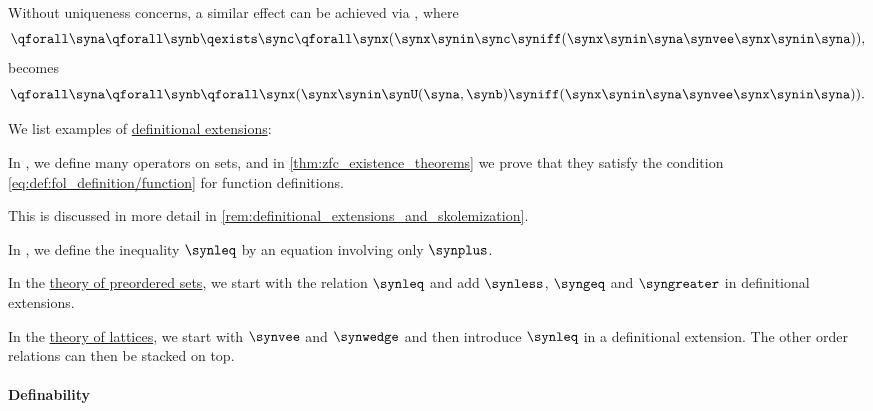 \begin{remark}
  Without uniqueness concerns, a similar effect can be achieved via , where
  \begin{equation*}
    \qforall \syna \qforall \synb \qexists \sync \qforall \synx (\synx \synin \sync \syniff (\synx \synin \syna \synvee \synx \synin \syna)),
  \end{equation*}
  becomes
  \begin{equation*}
    \qforall \syna \qforall \synb \qforall \synx (\synx \synin \synU(\syna, \synb) \syniff (\synx \synin \syna \synvee \synx \synin \syna)).
  \end{equation*}
\end{remark}

\begin{example}\label{ex:def:fol_definitional_extension}
  We list examples of \hyperref[def:fol_definitional_extension]{definitional extensions}:
  \begin{thmenum}
     In , we define many operators on sets, and in \cref{thm:zfc_existence_theorems} we prove that they satisfy the condition \eqref{eq:def:fol_definition/function} for function definitions.

    This is discussed in more detail in \cref{rem:definitional_extensions_and_skolemization}.

     In , we define the inequality \( {\synleq} \) by an equation involving only \( {\synplus} \).

     In the \hyperref[def:partially_ordered_set/theory]{theory of preordered sets}, we start with the relation \( {\synleq} \) and add \( {\synless} \), \( {\syngeq} \) and \( {\syngreater} \) in definitional extensions.

    In the \hyperref[def:lattice/theory]{theory of lattices}, we start with \( {\synvee} \) and \( {\synwedge} \) and then introduce \( {\synleq} \) in a definitional extension. The other order relations can then be stacked on top.
  \end{thmenum}
\end{example}

\paragraph{Definability}

